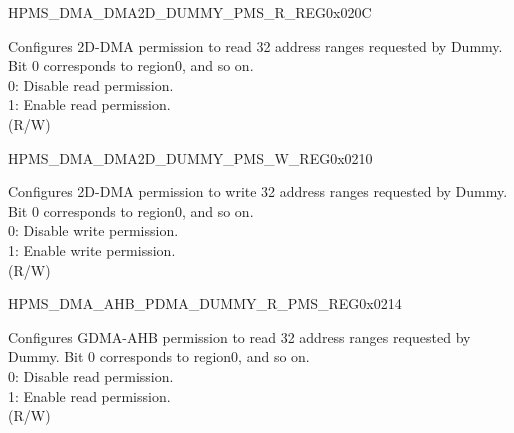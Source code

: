 \begin{register}{H}{PMS\_DMA\_DMA2D\_DUMMY\_PMS\_R\_REG}{0x020C}\label{regdesc:PMSDMADMA2DDUMMYPMSRREG}
%
\regnewline%
\begin{regdesc}\begin{reglist}
\label{fielddesc:PMSDMADMA2DDUMMYRPMS}\item [PMS\_DMA\_DMA2D\_DUMMY\_R\_PMS] Configures 2D-DMA permission to read 32 address ranges requested by Dummy. Bit 0 corresponds to region0, and so on.\\
0: Disable read permission.\\
1: Enable read permission.\\ (R/W)
\end{reglist}\end{regdesc}
\end{register}


\begin{register}{H}{PMS\_DMA\_DMA2D\_DUMMY\_PMS\_W\_REG}{0x0210}\label{regdesc:PMSDMADMA2DDUMMYPMSWREG}
%
\regnewline%
\begin{regdesc}\begin{reglist}
\label{fielddesc:PMSDMADMA2DDUMMYWPMS}\item [PMS\_DMA\_DMA2D\_DUMMY\_W\_PMS] Configures 2D-DMA permission to write 32 address ranges requested by Dummy. Bit 0 corresponds to region0, and so on.\\
0: Disable write permission.\\
1: Enable write permission.\\ (R/W)
\end{reglist}\end{regdesc}
\end{register}


\begin{register}{H}{PMS\_DMA\_AHB\_PDMA\_DUMMY\_R\_PMS\_REG}{0x0214}\label{regdesc:PMSDMAAHBPDMADUMMYRPMSREG}
%
\regnewline%
\begin{regdesc}\begin{reglist}
\label{fielddesc:PMSDMAAHBPDMADUMMYRPMS}\item [PMS\_DMA\_AHB\_PDMA\_DUMMY\_R\_PMS] Configures GDMA-AHB permission to read 32 address ranges requested by Dummy. Bit 0 corresponds to region0, and so on.\\
0: Disable read permission.\\
1: Enable read permission.\\ (R/W)
\end{reglist}\end{regdesc}
\end{register}


